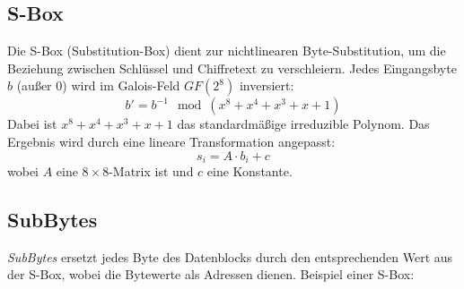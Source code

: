 \subsection{S-Box}
Die S-Box (Substitution-Box) dient zur nichtlinearen Byte-Substitution, um die Beziehung zwischen Schlüssel und Chiffretext zu verschleiern. Jedes Eingangsbyte \(b\) (außer 0) wird im Galois-Feld \(GF(2^8)\) inversiert:
\[
b' = b^{-1} \mod (x^8 + x^4 + x^3 + x + 1)
\]
Dabei ist \(x^8 + x^4 + x^3 + x + 1\) das standardmäßige irreduzible Polynom. Das Ergebnis wird durch eine lineare Transformation angepasst:
\[
s_i = A \cdot b_i + c
\]
wobei \(A\) eine $8 \times 8$-Matrix ist und \(c\) eine Konstante.\cite{Endliche_körper}\cite{S_Box}

\subsection{SubBytes}
\textit{SubBytes} ersetzt jedes Byte des Datenblocks durch den entsprechenden Wert aus der S-Box, wobei die Bytewerte als Adressen dienen. Beispiel einer S-Box:
\begin{table}[H]
    \caption{Beispiel einer S-Box im AES-Algorithmus}
\end{table}


